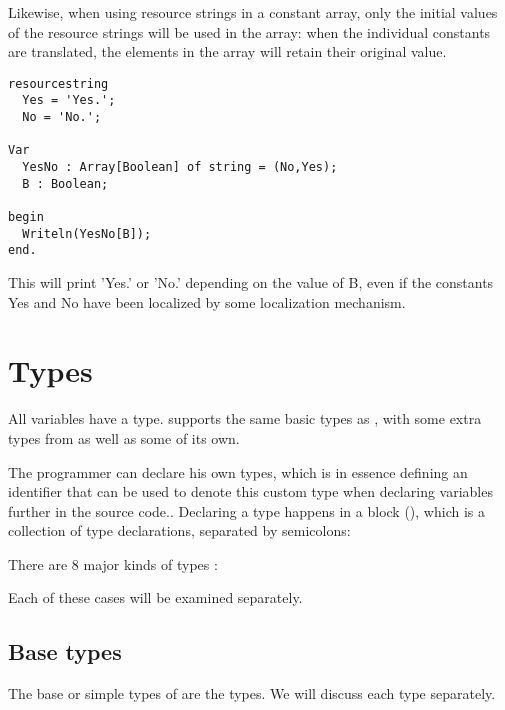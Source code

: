 \begin{remark}
Likewise, when using resource strings in a constant array, only the initial
values of the resource strings will be used in the array: when the
individual constants are translated, the elements in the array will retain
their original value.
\begin{verbatim}
resourcestring
  Yes = 'Yes.';
  No = 'No.';

Var
  YesNo : Array[Boolean] of string = (No,Yes);
  B : Boolean;

begin
  Writeln(YesNo[B]);
end.
\end{verbatim}
This will print 'Yes.' or 'No.' depending on the value of B, even if the 
constants Yes and No have been localized by some localization mechanism.
\end{remark}

\chapter{Types}
All variables have a type. \fpc supports the same basic types as \tp, with
some extra types from \delphi as well as some of its own.

The programmer can declare his own types, which is in essence defining an identifier
that can be used to denote this custom type when declaring variables further
in the source code.. Declaring a type happens
in a  block (), which is a collection of type declarations, separated
by semicolons:

There are 8 major kinds of types :

Each of these cases will be examined separately.

\section{Base types}
The base or simple types of \fpc are the \delphi types.
We will discuss each type separately.

